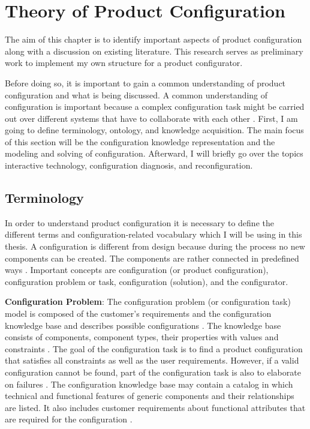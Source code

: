 \section{Theory of Product Configuration}\label{sec: Theory of product configuration}
The aim of this chapter is to identify important aspects of product configuration along with a discussion on existing literature. This research serves as preliminary work to implement my own structure for a product configurator. \newline

Before doing so, it is important to gain a common understanding of product configuration and what is being discussed. A common understanding of configuration is important because a complex configuration task might be carried out over different systems that have to collaborate with each other \cite{fefrjastza03a}. First, I am going to define terminology, ontology, and knowledge acquisition. The main focus of this section will be the configuration knowledge representation and the modeling and solving of configuration. Afterward, I will briefly go over the topics interactive technology, configuration diagnosis, and reconfiguration. 

\subsection{Terminology}

In order to understand product configuration it is necessary to define the different terms and configuration-related vocabulary which I will be using in this thesis. A configuration is different from design because during the process no new components can be created. The components are rather connected in predefined ways \cite{brown98}. Important concepts are configuration (or product configuration), configuration problem or task, configuration (solution), and the configurator. \newline

\textbf{Configuration Problem}: The configuration problem (or configuration task) model is composed of the customer's requirements and the configuration knowledge base \cite{sonitisu01a} and describes possible configurations \cite{junker06a}. The knowledge base consists of components, component types, their properties with values and constraints \cite{hofestrybawo14a, sotimasu98a}. The goal of the configuration task is to find a product configuration that satisfies all constraints as well as the user requirements. However, if a valid configuration cannot be found, part of the configuration task is also to elaborate on failures \cite{junker06a}. The configuration knowledge base may contain a catalog in which technical and functional features of generic components and their relationships are listed. It also includes customer requirements about functional attributes that are required for the configuration \cite{junker06a}.\newline

